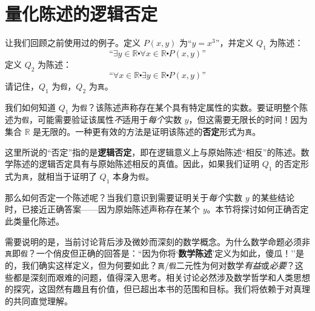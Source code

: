 \section{量化陈述的逻辑否定}\label{sec:section4.4}

让我们回顾之前使用过的例子。定义 $P(x, y)$ 为``$y = x^3$''，并定义 $Q_1$ 为陈述：
\[\text{``}\exists y \in \mathbb{R} \centerdot \forall x \in \mathbb{R} \centerdot P(x, y)\text{''}\]
定义 $Q_2$ 为陈述：
\[\text{``}\forall x \in \mathbb{R} \centerdot \exists y \in \mathbb{R} \centerdot P(x, y)\text{''}\]
请记住，$Q_1$ 为\verb|假|，$Q_2$ 为\verb|真|。

我们如何知道 $Q_1$ 为\verb|假|？该陈述声称存在某个具有特定属性的实数。要证明整个陈述为\verb|假|，可能需要验证该属性\emph{不}适用于\emph{每个}实数 $y$，但这需要无限长的时间！因为集合 $\mathbb{R}$ 是无限的。一种更有效的方法是证明该陈述的\textbf{否定}形式为\verb|真|。

这里所说的``否定''指的是\textbf{逻辑否定}，即在逻辑意义上与原始陈述``相反''的陈述。数学陈述的逻辑否定具有与原始陈述相反的真值。因此，如果我们证明 $Q_1$ 的否定形式为\verb|真|，就相当于证明了 $Q_1$ 本身为\verb|假|。

那么如何否定一个陈述呢？当我们意识到需要证明关于\emph{每个}实数 $y$ 的某些结论时，已接近正确答案——因为原始陈述声称存在某个 $y$。本节将探讨如何正确否定此类量化陈述。

需要说明的是，当前讨论背后涉及微妙而深刻的数学概念。为什么数学命题必须非\verb|真|即\verb|假|？一个俏皮但正确的回答是：``因为你将`\textbf{数学陈述}'定义为如此，傻瓜！''是的，我们确实这样定义，但为何要如此？\verb|真|/\verb|假|二元性为何对数学\emph{有益}或\emph{必要}？这些都是深刻而艰难的问题，值得深入思考。相关讨论必然涉及数学哲学和人类思想的探究，这固然有趣且有价值，但已超出本书的范围和目标。我们将依赖于对真理的共同直觉理解。













